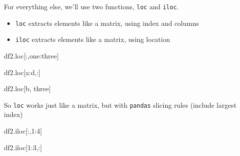 \documentclass[
  letterpaper,
]{scrbook}
\newenvironment{Shaded}{\begin{snugshade}}{\end{snugshade}}
\newcommand{\DecValTok}[1]{\textcolor[rgb]{0.00,0.00,0.81}{#1}}
\newcommand{\NormalTok}[1]{#1}
\newcommand{\StringTok}[1]{\textcolor[rgb]{0.31,0.60,0.02}{#1}}
\providecommand{\tightlist}{%
  \setlength{\itemsep}{0pt}\setlength{\parskip}{0pt}}
\begin{document}
For everything else, we'll use two functions, \texttt{loc} and \texttt{iloc}.

\begin{itemize}
\tightlist
\item
  \texttt{loc} extracts elements like a matrix, using index and columns
\item
  \texttt{iloc} extracts elements like a matrix, using location
\end{itemize}

\begin{Shaded}
\begin{Highlighting}[]
\NormalTok{df2.loc[:,}\StringTok{\textquotesingle{}one\textquotesingle{}}\NormalTok{:}\StringTok{\textquotesingle{}three\textquotesingle{}}\NormalTok{]}
\end{Highlighting}
\end{Shaded}

\begin{Shaded}
\begin{Highlighting}[]
\NormalTok{df2.loc[}\StringTok{\textquotesingle{}a\textquotesingle{}}\NormalTok{:}\StringTok{\textquotesingle{}d\textquotesingle{}}\NormalTok{,:]}
\end{Highlighting}
\end{Shaded}

\begin{Shaded}
\begin{Highlighting}[]
\NormalTok{df2.loc[}\StringTok{\textquotesingle{}b\textquotesingle{}}\NormalTok{, }\StringTok{\textquotesingle{}three\textquotesingle{}}\NormalTok{]}
\end{Highlighting}
\end{Shaded}

So \texttt{loc} works just like a matrix, but with \texttt{pandas} slicing rules (include largest index)

\begin{Shaded}
\begin{Highlighting}[]
\NormalTok{df2.iloc[:,}\DecValTok{1}\NormalTok{:}\DecValTok{4}\NormalTok{]}
\end{Highlighting}
\end{Shaded}

\begin{Shaded}
\begin{Highlighting}[]
\NormalTok{df2.iloc[}\DecValTok{1}\NormalTok{:}\DecValTok{3}\NormalTok{,:]}
\end{Highlighting}
\end{Shaded}
\end{document}
